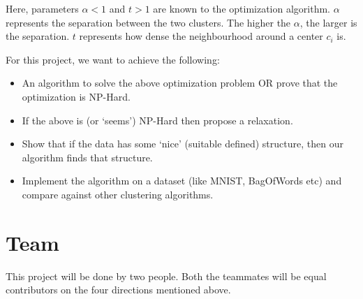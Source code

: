 \documentclass{article}
\begin{document}
Here, parameters $\alpha < 1$ and $t > 1$ are known to the optimization algorithm. $\alpha$ represents the separation between the two clusters. The higher the $\alpha$, the larger is the separation. $t$ represents how dense the neighbourhood around a center $c_i$ is. 

For this project, we want to achieve the following:
\begin{itemize}
\item An algorithm to solve the above optimization problem OR prove that the optimization is NP-Hard. 
\item If the above is (or `seems') NP-Hard then propose a relaxation.
\item Show that if the data has some `nice' (suitable defined) structure, then our algorithm finds that structure.
\item Implement the algorithm on a dataset (like MNIST, BagOfWords etc) and compare against other clustering algorithms.
\end{itemize}


\section{Team}
This project will be done by two people. Both the teammates will be equal contributors on the four directions mentioned above.



\end{document}

